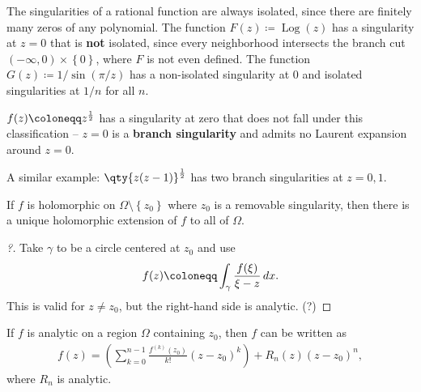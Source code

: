 \begin{example}[?]

The singularities of a rational function are always isolated, since
there are finitely many zeros of any polynomial. The function
\(F(z) \coloneqq\operatorname{Log}(z)\) has a singularity at \(z=0\)
that is \textbf{not} isolated, since every neighborhood intersects the
branch cut \((-\infty, 0) \times\left\{{ 0 }\right\}\), where \(F\) is
not even defined. The function \(G(z) \coloneqq 1/\sin(\pi/z)\) has a
non-isolated singularity at 0 and isolated singularities at \(1/n\) for
all \(n\).

\end{example}

\begin{warnings}

\(f(z) \coloneqq z^{1\over 2}\) has a singularity at zero that does not
fall under this classification -- \(z=0\) is a \textbf{branch
singularity} and admits no Laurent expansion around \(z=0\).

A similar example: \(\qty{z(z-1)}^{1\over 2}\) has two branch
singularities at \(z=0, 1\).

\end{warnings}

\begin{theorem}

If \(f\) is holomorphic on \(\Omega\setminus\left\{{z_0}\right\}\) where
\(z_0\) is a removable singularity, then there is a unique holomorphic
extension of \(f\) to all of \(\Omega\).

\end{theorem}

\begin{proof}[?]

Take \(\gamma\) to be a circle centered at \(z_0\) and use
\begin{align*}
f(z) \coloneqq\int_\gamma { f(\xi) \over \xi - z} \,dx
.\end{align*}
This is valid for \(z\neq z_0\), but the right-hand side is analytic.
(?)

\end{proof}


\begin{theorem}

If \(f\) is analytic on a region \(\Omega\) containing \(z_0\), then
\(f\) can be written as
\begin{align*}
f(z)
=\left(\sum_{k=0}^{n-1} \frac{f^{(k)}\left(z_{0}\right)}{k !}\left(z-z_{0}\right)^{k}\right)+ 
R_{n}(z)\left(z-z_{0}\right)^{n}
,\end{align*}
where \(R_n\) is analytic.

\end{theorem}

